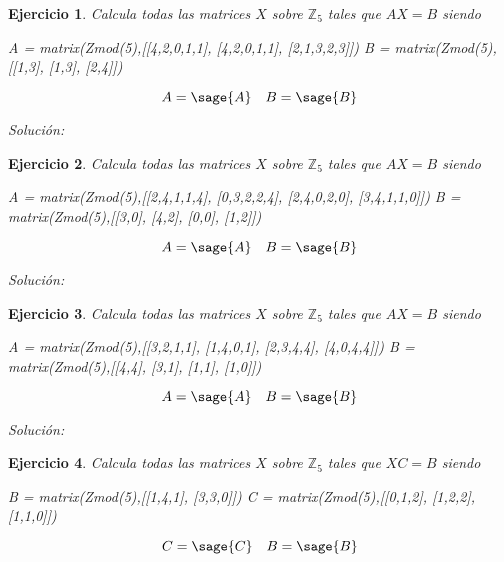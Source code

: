 \documentclass{amsart}
\newtheorem{ejer}{Ejercicio}
\begin{document}
\begin{ejer}
Calcula todas las matrices $X$ sobre ${\mathbb Z}_5$ tales que $AX = B$ siendo

\begin{sageblock}
A =  matrix(Zmod(5),[[4,2,0,1,1],
[4,2,0,1,1],
[2,1,3,2,3]])
B =  matrix(Zmod(5),[[1,3],
[1,3],
[2,4]])
\end{sageblock}

$$ A = \sage{A} \quad B = \sage{B} $$
\end{ejer}

{\it Solución:} 



\begin{ejer}
Calcula todas las matrices $X$ sobre ${\mathbb Z}_5$ tales que $AX = B$ siendo

\begin{sageblock}
A =  matrix(Zmod(5),[[2,4,1,1,4],
[0,3,2,2,4],
[2,4,0,2,0],
[3,4,1,1,0]])
B =  matrix(Zmod(5),[[3,0],
[4,2],
[0,0],
[1,2]])
\end{sageblock}

$$ A = \sage{A} \quad B = \sage{B} $$
\end{ejer}

{\it Solución:} 



\begin{ejer}
Calcula todas las matrices $X$ sobre ${\mathbb Z}_5$ tales que $AX = B$ siendo

\begin{sageblock}
A =  matrix(Zmod(5),[[3,2,1,1],
[1,4,0,1],
[2,3,4,4],
[4,0,4,4]])
B =  matrix(Zmod(5),[[4,4],
[3,1],
[1,1],
[1,0]])
\end{sageblock}

$$ A = \sage{A} \quad B = \sage{B} $$
\end{ejer}

{\it Solución:} 



\begin{ejer}
Calcula todas las matrices $X$ sobre ${\mathbb Z}_5$ tales que $XC = B$ siendo

\begin{sageblock}
B =  matrix(Zmod(5),[[1,4,1],
[3,3,0]])
C =  matrix(Zmod(5),[[0,1,2],
[1,2,2],
[1,1,0]])
\end{sageblock}

$$ C = \sage{C} \quad B = \sage{B} $$
\end{ejer}
\end{document}

